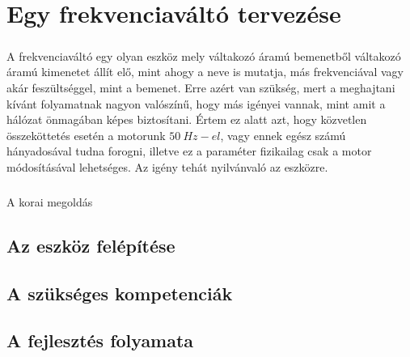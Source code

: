 \chapter{Egy frekvenciaváltó tervezése}

\paragraph{}
A frekvenciaváltó egy olyan eszköz mely váltakozó áramú bemenetből váltakozó áramú kimenetet állít elő, mint ahogy a neve is mutatja, más frekvenciával vagy akár feszültséggel, mint a bemenet. Erre azért van szükség, mert a meghajtani kívánt folyamatnak nagyon valószínű, hogy más igényei vannak, mint amit a hálózat önmagában képes biztosítani. Értem ez alatt azt, hogy közvetlen összeköttetés esetén a motorunk $50\ Hz-el$, vagy ennek egész számú hányadosával tudna forogni, illetve ez a paraméter fizikailag csak a motor módosításával lehetséges. Az igény tehát nyilvánvaló az eszközre.

\paragraph{}
A korai megoldás

\section{Az eszköz felépítése}



\section{A szükséges kompetenciák}
\section{A fejlesztés folyamata}
